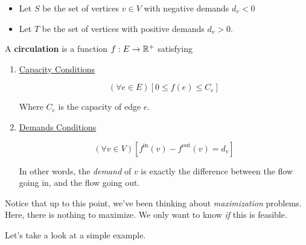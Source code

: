 \documentclass[12pt]{article}
\begin{document}

  \begin{itemize}
    \item Let $S$ be the set of vertices $v \in V$ with negative demands $d_v < 0$
    \item Let $T$ be the set of vertices with positive demands $d_v > 0$.
  \end{itemize}

   {
    A {\bf circulation} is a function $f: E \to {\mathbb R}^+$ satisfying

    \begin{enumerate}
      \item \underline{Capacity Conditions}

        \[
          (\forall e \in E) [0 \le f(e) \le C_e]
        \]

        Where $C_e$ is the capacity of edge $e$.

      \item \underline{Demands Conditions}

        \[
          (\forall v \in V)[f^\text{in}(v) - f^\text{out}(v) = d_v]
        \]

        In other words, the {\it demand} of $v$ is exactly the difference
        between the flow going in, and the flow going out.
    \end{enumerate}
  }

  Notice that up to this point, we've been thinking about {\it maximization}
  problems. Here, there is nothing to maximize. We only want to know {\it if}
  this is feasible.

  Let's take a look at a simple example.
\end{document}
